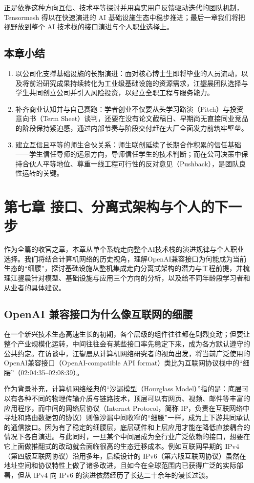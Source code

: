 \documentclass[UTF8,a4paper,11pt,fontset=fandol]{ctexart}
\begin{document}
正是依靠这种方向互信、技术平等探讨并用真实用户反馈驱动迭代的团队机制，Tensormesh 得以在快速演进的 AI 基础设施生态中稳步推进；最后一章我们将把视野放到整个 AI 技术栈的接口演进与个人职业选择上。
\subsection{本章小结}
\begin{enumerate}
\item 以公司化支撑基础设施的长期演进：面对核心博士生即将毕业的人员流动，以及将前沿研究成果持续转化为工业级基础设施的资源需求，江鋆晨团队选择与学生共同创立公司并引入风险投资，以建立全职工程与服务能力。
\item 补齐商业认知并与自己赛跑：学者创业不仅要从头学习路演（Pitch）与投资意向书（Term Sheet）谈判，还要在没有论文截稿日、早期尚无直接同业竞品的阶段保持紧迫感，通过内部节奏与阶段交付赶在大厂全面发力前筑牢壁垒。
\item 建立互信且平等的师生合伙关系：师生联创延续了长期合作积累的信任基础——学生信任导师的远景方向，导师信任学生的技术判断；而在公司决策中保持合伙人平等地位、尊重一线工程可行性的反对意见（Pushback），是团队良性运转的关键。
\end{enumerate}
\section{第七章 接口、分离式架构与个人的下一步}
作为全篇的收官之章，本章从单个系统走向整个AI技术栈的演进规律与个人职业选择。我们将结合计算机网络的历史视角，理解OpenAI兼容接口为何能成为当前生态的“细腰”，探讨基础设施从整机集成走向分离式架构的潜力与工程前提，并梳理江鋆晨针对模型、基础设施与应用三个方向的分析，以及给不同年龄段学习者和从业者的具体建议。
\subsection{OpenAI 兼容接口为什么像互联网的细腰}
在一个新兴技术生态高速生长的初期，各个层级的组件往往都在剧烈变动；但要让整个产业规模化运转，中间往往会有某些接口率先稳定下来，成为各方默认遵守的公共约定。在访谈中，江鋆晨从计算机网络研究者的视角出发，将当前广泛使用的OpenAI兼容接口（OpenAI-compatible API format）类比为互联网协议栈中的“细腰”（02:04:35–02:08:39）。

作为背景补充，计算机网络经典的“沙漏模型（Hourglass Model）”指的是：底层可以有各种不同的物理传输介质与链路技术，顶层可以有网页、视频、邮件等丰富的应用程序，而中间的网络层协议（Internet Protocol，简称 IP，负责在互联网络中寻址和路由数据包的协议）则像沙漏中间收窄的“细腰”一样，成为上下游共同承认的通信接口。因为有了稳定的细腰层，底层硬件和上层应用才能在降低直接耦合的情况下各自演进。与此同时，一旦某个中间层成为全行业广泛依赖的接口，想要在它上面做推翻式的改动就会面临很高的生态迁移成本。例如互联网早期的 IPv4（第四版互联网协议）沿用多年，后续设计的 IPv6（第六版互联网协议）虽然在地址空间和协议特性上做了诸多改进，且如今在全球范围内已获得广泛的实际部署，但从 IPv4 向 IPv6 的演进依然经历了长达二十余年的漫长过渡。
\end{document}
